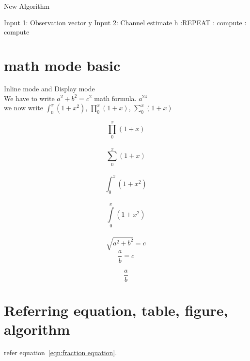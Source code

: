 \documentclass[a4paper, 12pt]{article}
\begin{document}
	\begin{algorithm}
	\caption{New Algorithm}
	\begin{algorithmic}
		\STATE Input 1: Observation vector y
		\STATE Input 2: Channel estimate h
		:REPEAT
		:   compute
		:   compute
				
	\end{algorithmic}
	\end{algorithm}

\newpage
\section{math mode basic}
Inline mode and Display mode\\
We have to write $a^2 + b^2 = c^2$ math formula.
$a^{24}$\\
we now write $\int_{0}^{x}(1 + x^2)$,
$\prod_{0}^{x}(1 + x)$, $\sum_{0}^{x} (1 + x)$


$$ \prod_{0}^{x}(1 + x)$$\\
$$\sum_{0}^{x} (1 + x)$$\\
$$\int_{0}^{x}(1 + x^2)$$\\
$$\int\limits_{0}^{x}(1 + x^2)$$\\

\begin{equation}
	\sqrt{a^2 + b^2} = c
\end{equation}
\begin{equation}
	\frac{a}{b} = c
\end{equation}

\newpage\begin{equation}
	\frac{a}{b}
	\label{eqn:fraction equation}
\end{equation}

\newpage
\section{Referring equation, table, figure, algorithm}
refer equation~\ref{eqn:fraction equation}.
\end{document}
